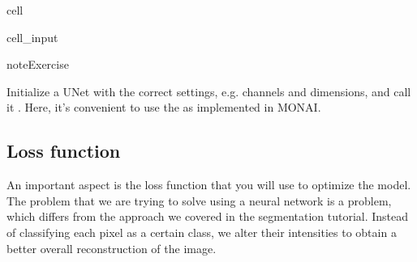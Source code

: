 \documentclass[letterpaper,10pt,english]{jupyterBook}
\begin{document}
\begin{sphinxuseclass}{cell}\begin{sphinxVerbatimInput}

\begin{sphinxuseclass}{cell_input}
\begin{sphinxVerbatim}[commandchars=\\\{\}]
 

 
      
 
      
      
\end{sphinxVerbatim}

\end{sphinxuseclass}\end{sphinxVerbatimInput}

\end{sphinxuseclass}
\begin{sphinxadmonition}{note}{Exercise}

\sphinxAtStartPar
Initialize a U\sphinxhyphen{}Net with the correct settings, e.g. channels and dimensions, and call it . Here, it’s convenient to use the  as implemented in MONAI.
\end{sphinxadmonition}


\subsection{Loss function}
\label{\detokenize{notebooks/Tutorial5_Reconstruction/Tutorial5_Reconstruction_student:loss-function}}
\sphinxAtStartPar
An important aspect is the loss function that you will use to optimize the model. The problem that we are trying to solve using a neural network is a  problem, which differs from the  approach we covered in the segmentation tutorial. Instead of classifying each pixel as a certain class, we alter their intensities to obtain a better overall reconstruction of the image.
\end{document}
